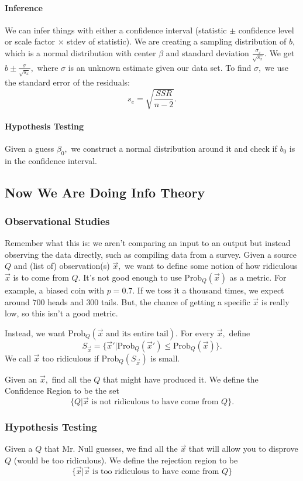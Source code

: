 \documentclass[12pt]{article}
\theoremstyle{remark}
\begin{document}
\paragraph{Inference}
We can infer things with either a confidence interval (statistic $\pm$ confidence level or scale factor $\times$ stdev of statistic). We are creating a sampling distribution of $b,$ which is a normal distribution with center $\beta$ and standard deviation $\frac{\sigma_\varepsilon}{\sqrt{s_x}}.$ We get $b\pm \frac{\sigma}{\sqrt{s_x}},$ where $\sigma$ is an unknown estimate given our data set. To find $\sigma,$ we use the standard error of the residuals:
\[s_e=\sqrt{\frac{SSR}{n-2}}.\]

\paragraph{Hypothesis Testing}
Given a guess $\beta_0,$ we construct a normal distribution around it and check if $b_0$ is in the confidence interval.
\subsection{Now We Are Doing Info Theory}
\subsubsection{Observational Studies}
Remember what this is: we aren't comparing an input to an output but instead observing the data directly, such as compiling data from a survey. Given a source $Q$ and (list of) observation(s) $\vec{x},$  we want to define some notion of how ridiculous $\vec{x}$ is to come from $Q.$ It's not good enough to use $\text{Prob}_Q(\vec{x})$ as a metric. For example, a biased coin with $p=0.7.$ If we toss it a thousand times, we expect around $700$ heads and $300$ tails. But, the chance of getting a specific $\vec{x}$ is really low, so this isn't a good metric.

Instead, we want $\text{Prob}_Q(\vec{x}\text{ and its entire tail}).$ For every $\vec{x},$ define
\[S_{\vec{x}}=\{\vec{x}'|\text{Prob}_Q(\vec{x}')\le \text{Prob}_Q(\vec{x})\}.\] We call $\vec{x}$ too ridiculous if $\text{Prob}_Q (S_{\vec{x}})$ is small.

Given an $\vec{x},$ find all the $Q$ that might have produced it. We define the Confidence Region to be the set
\[\{Q|\vec{x}\text{ is not ridiculous to have come from }Q\}.\]

\subsubsection{Hypothesis Testing}
Given a $Q$ that Mr. Null guesses, we find all the $\vec{x}$ that will allow you to disprove $Q$ (would be too ridiculous). We define the rejection region to be
\[\{\vec{x}|\vec{x}\text{ is too ridiculous to have come from } Q\}\]
\end{document}
